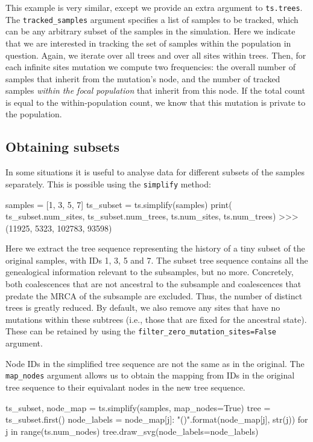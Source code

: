 \documentclass[graybox]{svmult}
\begin{document}
    This example is very similar, except we provide an extra argument to
\texttt{ts.trees}. The \texttt{tracked\_samples} argument specifies a list of samples to be tracked, which can be
any arbitrary subset of the samples in the simulation. Here we indicate
that we are interested in tracking the set of samples within the
population in question. Again, we iterate over all trees and over all
sites within trees. Then, for each infinite sites mutation we
compute two frequencies: the overall number of samples that inherit from
the mutation's node, and the number of tracked samples \emph{within the focal
population} that inherit from this node. If the total count is
equal to the within-population count, we know that this mutation is private to the population.

\subsection{Obtaining subsets}\label{obtaining-subsets}

In some situations it is useful to analyse data for different subsets of
the samples separately. This is possible using the \texttt{simplify}
method:

\begin{pythoncode}
samples = [1, 3, 5, 7]
ts_subset = ts.simplify(samples)
print(
    ts_subset.num_sites, ts_subset.num_trees,
    ts.num_sites, ts.num_trees)
>>> (11925, 5323, 102783, 93598)
\end{pythoncode}

Here we extract the tree sequence representing the history of a tiny
subset of the original samples, with IDs 1, 3, 5 and 7. The subset tree
sequence contains all the genealogical information relevant to the
subsamples, but no more. Concretely, both coalescences that are not ancestral to the
subsample and coalescences that predate
the MRCA of the subsample are excluded. Thus, the number of distinct trees is greatly
reduced. By default, we also remove any sites that have no mutations
within these subtrees (i.e., those that are fixed for the ancestral
state). These can be retained by using the
\texttt{filter\_zero\_mutation\_sites=False} argument.

Node IDs in the simplified tree sequence are not the same as in the
original. The \texttt{map\_nodes} argument allows us to obtain the
mapping from IDs in the original tree sequence to their equivalant nodes
in the new tree sequence.

\begin{pythoncode}
ts_subset, node_map = ts.simplify(samples, map_nodes=True)
tree = ts_subset.first()
node_labels = {
    node_map[j]: "{}({})".format(node_map[j], str(j))
    for j in range(ts.num_nodes)}
tree.draw_svg(node_labels=node_labels)
\end{pythoncode}
\end{document}
